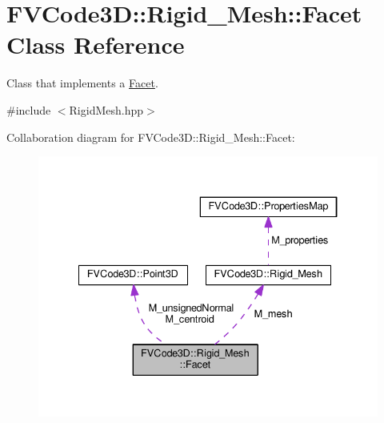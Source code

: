 \hypertarget{classFVCode3D_1_1Rigid__Mesh_1_1Facet}{}\section{F\+V\+Code3D\+:\+:Rigid\+\_\+\+Mesh\+:\+:Facet Class Reference}
\label{classFVCode3D_1_1Rigid__Mesh_1_1Facet}


Class that implements a \hyperlink{classFVCode3D_1_1Rigid__Mesh_1_1Facet}{Facet}.  




{\ttfamily \#include $<$Rigid\+Mesh.\+hpp$>$}



Collaboration diagram for F\+V\+Code3D\+:\+:Rigid\+\_\+\+Mesh\+:\+:Facet\+:
\nopagebreak
\begin{figure}[H]
\begin{center}
\leavevmode
\includegraphics[width=334pt]{classFVCode3D_1_1Rigid__Mesh_1_1Facet__coll__graph}
\end{center}
\end{figure}
